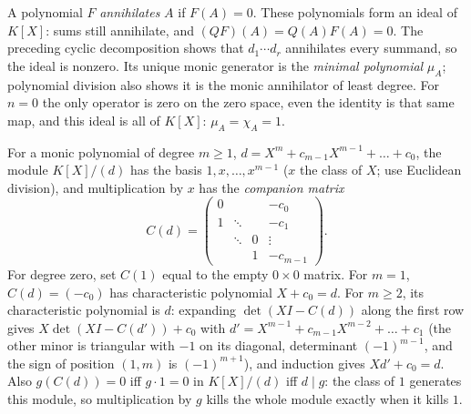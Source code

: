 A polynomial $F$ \emph{annihilates} $A$ if $F(A)=0$.
These polynomials form an ideal of $K[X]$: sums still annihilate,
and $(QF)(A)=Q(A)F(A)=0$. The preceding cyclic decomposition shows
that $d_1\cdots d_r$ annihilates every summand, so the ideal is nonzero.
Its unique monic generator is the \emph{minimal polynomial} $\mu_A$;
polynomial division also shows it is the monic annihilator of least degree.
For $n=0$ the only operator is zero on the zero space, even the identity
is that same map, and this ideal is all of $K[X]$: $\mu_A=\chi_A=1$.

For a monic polynomial of degree $m\ge1$, $d=X^m+c_{m-1}X^{m-1}+\dots+c_0$, the module $K[X]/(d)$ has the basis $1,x,\dots,x^{m-1}$ ($x$ the class of $X$; use Euclidean division), and multiplication by $x$ has the \emph{companion matrix}
\[
C(d)=\begin{pmatrix}0&&&-c_0\\1&\ddots&&-c_1\\&\ddots&0&\vdots\\&&1&-c_{m-1}\end{pmatrix}.
\]
For degree zero, set $C(1)$ equal to the empty $0\times0$ matrix.
For $m=1$, $C(d)=(-c_0)$ has characteristic polynomial $X+c_0=d$.
For $m\ge2$, its characteristic polynomial is $d$: expanding $\det(XI-C(d))$ along the first row gives $X\det(XI-C(d'))+c_0$ with $d'=X^{m-1}+c_{m-1}X^{m-2}+\dots+c_1$ (the other minor is triangular with $-1$ on its diagonal, determinant $(-1)^{m-1}$, and the sign of position $(1,m)$ is $(-1)^{m+1}$), and induction gives $Xd'+c_0=d$. Also $g(C(d))=0$ iff $g\cdot1=0$ in $K[X]/(d)$ iff $d\mid g$: the class of $1$ generates this module, so multiplication by $g$ kills the whole module exactly when it kills $1$.

